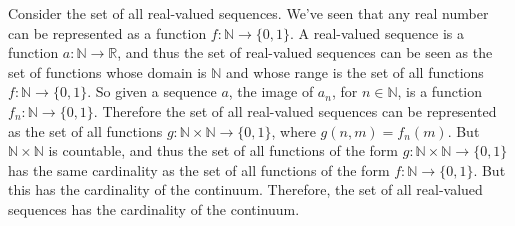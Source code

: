 \documentclass[crop=false,class=book,oneside]{standalone}
\begin{document}
            \begin{lexample}
                Consider the set of all real-valued sequences. We've seen
                that any real number can be represented as a function
                $f:\mathbb{N}\rightarrow\{0,1\}$. A real-valued sequence
                is a function $a:\mathbb{N}\rightarrow\mathbb{R}$, and
                thus the set of real-valued sequences can be seen as the
                set of functions whose domain is $\mathbb{N}$ and whose
                range is the set of all functions
                $f:\mathbb{N}\rightarrow\{0,1\}$. So given a sequence
                $a$, the image of $a_{n}$, for $n\in\mathbb{N}$, is a
                function $f_{n}:\mathbb{N}\rightarrow\{0,1\}$. Therefore
                the set of all real-valued sequences can be represented
                as the set of all functions
                $g:\mathbb{N}\times\mathbb{N}\rightarrow\{0,1\}$, where
                $g(n,m)=f_{n}(m)$. But $\mathbb{N}\times\mathbb{N}$ is
                countable, and thus the set of all functions of the form
                $g:\mathbb{N}\times\mathbb{N}\rightarrow\{0,1\}$ has the
                same cardinality as the set of all functions of the form
                $f:\mathbb{N}\rightarrow\{0,1\}$. But this has the
                cardinality of the continuum. Therefore, the set of all
                real-valued sequences has the cardinality of the continuum.
            \end{lexample}
\end{document}
